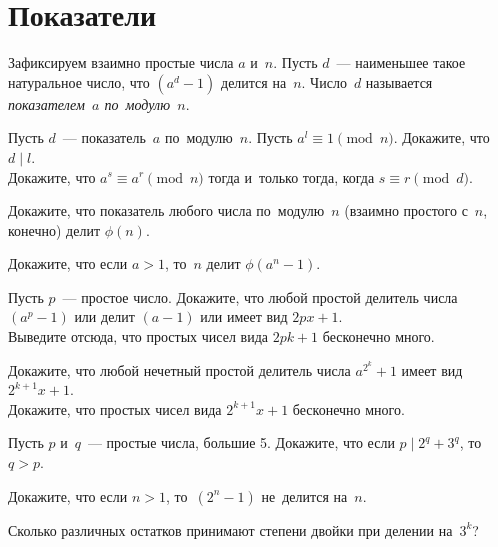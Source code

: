 
\section*{Показатели}


Зафиксируем взаимно простые числа $a$ и~$n$.
Пусть $d$~--- наименьшее такое натуральное число, что $(a^d - 1)$ делится
на~$n$.
Число~$d$ называется \emph{показателем~$a$ по~модулю~$n$}.

\begin{problems}

\item
\sp
Пусть $d$~--- показатель~$a$ по~модулю~$n$.
Пусть $a^l \equiv 1 \pmod{n}$.
Докажите, что $d \mid l$.
\\
\sp
Докажите, что $a^s \equiv a^r \pmod{n}$ тогда и~только тогда, когда
$s \equiv r \pmod{d}$.

\item
Докажите, что показатель любого числа по~модулю~$n$ (взаимно простого с~$n$,
конечно) делит $\phi(n)$.

\item
Докажите, что если $a > 1$, то~$n$ делит $\phi(a^n - 1)$.

\item
\sp
Пусть $p$~--- простое число.
Докажите, что любой простой делитель числа $(a^p - 1)$ или делит $(a - 1)$ или
имеет вид $2 p x + 1$.
\\
\sp
Выведите отсюда, что простых чисел вида $2 p k + 1$ бесконечно много.

\item
\sp
Докажите, что любой нечетный простой делитель числа $a^{2^{k}} + 1$ имеет вид
$2^{k+1} x + 1$.
\\
\sp
Докажите, что простых чисел вида $2^{k+1} x + 1$ бесконечно много.

\item
Пусть $p$ и~$q$~--- простые числа, большие 5.
Докажите, что если $p \mid 2^q + 3^q$, то~$q > p$.

\item
Докажите, что если $n > 1$, то~$(2^n - 1)$ не~делится на~$n$. 

\item
Сколько различных остатков принимают степени двойки при делении на~$3^k$?

\end{problems}

